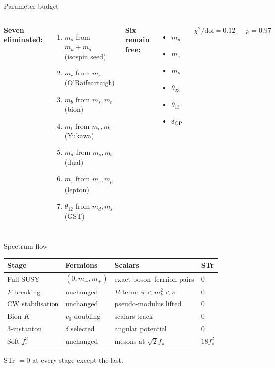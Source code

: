 \documentclass[aspectratio=169,12pt]{beamer}
\newcommand{\fpi}{f_\pi}
\begin{document}
\begin{frame}{Parameter budget}

\begin{columns}[T]
\textbf{Seven eliminated:}
\begin{enumerate}
\item $m_s$ from $m_u{+}m_d$ (isospin seed)
\item $m_c$ from $m_s$ (O'Raifeartaigh)
\item $m_b$ from $m_s, m_c$ (bion)
\item $m_t$ from $m_c, m_b$ (Yukawa)
\item $m_d$ from $m_s, m_b$ (dual)
\item $m_\tau$ from $m_e, m_\mu$ (lepton)
\item $\theta_{12}$ from $m_d, m_s$ (GST)
\end{enumerate}

\textbf{Six remain free:}
\begin{itemize}
\item $m_u$
\item $m_e$
\item $m_\mu$
\item $\theta_{23}$
\item $\theta_{13}$
\item $\delta_{\rm CP}$
\end{itemize}

\bigskip
$\chi^2/\text{dof} = 0.12$

$p = 0.97$
\end{columns}

\end{frame}

\begin{frame}{Spectrum flow}

\small
\begin{center}
\begin{tabular}{p{2.8cm}p{3.5cm}p{5cm}l}
\toprule
Stage & Fermions & Scalars & STr \\
\midrule
Full SUSY & $(0, m_-, m_+)$
  & exact boson--fermion pairs & $0$ \\[3pt]
$F$-breaking & unchanged
  & $B$-term: $\pi < m_k^2 < \sigma$ & $0$ \\[3pt]
CW stabilisation & unchanged
  & pseudo-modulus lifted & $0$ \\[3pt]
Bion $K$ & $v_0$-doubling
  & scalars track & $0$ \\[3pt]
3-instanton & $\delta$ selected
  & angular potential & $0$ \\[3pt]
Soft $\fpi^2$ & unchanged
  & mesons at $\sqrt{2}\fpi$ & $18\fpi^2$ \\
\bottomrule
\end{tabular}
\end{center}

STr $= 0$ at every stage except the last.

\end{frame}
\end{document}
